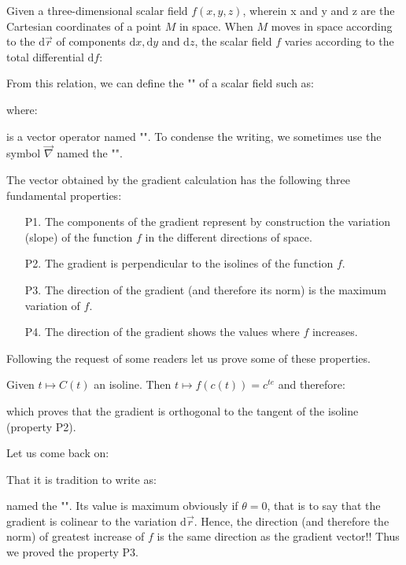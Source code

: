 	Given a three-dimensional scalar field $f(x,y,z)$, wherein x and y and z are the Cartesian coordinates of a point $M$ in space. When $M$ moves in space according to the $\mathrm{d}\vec{r}$ of components $\mathrm{d}x, \mathrm{d}y$ and $\mathrm{d}z$, the scalar field $f$ varies according to the total differential $\mathrm{d}f$:
	
	From this relation, we can define the "" of a scalar field such as:
	
	where:
	
	is a vector operator named "". To condense the writing, we sometimes use the symbol $\vec{\nabla}$ named the "".
	
	The vector obtained by the gradient calculation has the following three fundamental properties:
	\begin{enumerate}
		\item[P1.] The components of the gradient represent by construction the variation (slope) of the function $f$ in the different directions of space.
		
		\item[P2.] The gradient is perpendicular to the isolines of the function $f$.

		\item[P3.] The direction of the gradient (and therefore its norm) is the maximum variation of $f$.

		\item[P4.] The direction of the gradient shows the values where $f$ increases.
	\end{enumerate}
	\label{gradient normal}Following the request of some readers let us prove some of these properties.
	
	Given $t\mapsto C(t)$ an isoline. Then $t\mapsto f(c(t))=c^{te}$ and therefore:
	  
	which proves that the gradient is orthogonal to the tangent of the isoline (property P2).
	
	Let us come back on:
	
	That it is tradition to write as:
	
	named the "". Its value is maximum obviously if $\theta=0$, that is to say that the gradient is colinear to the variation $\mathrm{d}\vec{r}$. Hence, the direction (and therefore the norm) of greatest increase of $f$ is the same direction as the gradient vector!! Thus we proved the property P3.
	

